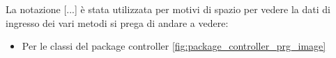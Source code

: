 La notazione [...] è stata utilizzata per motivi di spazio per vedere la dati di ingresso dei vari metodi si prega di andare a vedere:
\begin{itemize}
    \item Per le classi del package controller \ref{fig:package_controller_prg_image}
\end{itemize}

